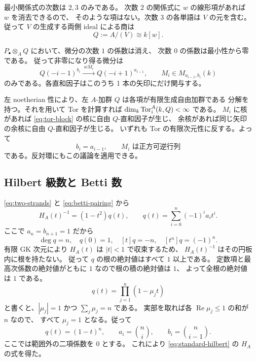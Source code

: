 最小関係式の次数は \(2,3\) のみである。
次数 \(2\) の関係式に \(w\) の線形項があれば \(w\) を消去できるので、
そのような項はない。次数 \(3\) の各単語は \(V\) の元を含む。
従って \(V\) の生成する両側 ideal による商は
\begin{equation}\label{eq:quotient-Q}
Q:=A/(V)\cong k[w].
\end{equation}

\(P_\bullet\otimes_AQ\) において、微分の次数 \(1\) の係数は消え、
次数 \(0\) の係数は最小性から零である。
従って非零になり得る微分は
\begin{equation}\label{eq:tor-block}
Q(-i-1)^{b_i}\xrightarrow{\;wM_i\;}
Q(-i+1)^{a_{i-1}},\qquad
M_i\in M_{a_{i-1},b_i}(k)
\end{equation}
のみである。各直和因子はこのうち 1 本の矢印にだけ関与する。

左 noetherian 性により、左 \(A\)-加群 \(Q\) は各項が有限生成自由加群である
分解を持つ。それを用いて Tor を計算すれば
\(\dim_k\operatorname{Tor}_i^A(k,Q)<\infty\) である。
\(M_i\) に核があれば \eqref{eq:tor-block} の核に自由 \(Q\)-直和因子が生じ、
余核があれば同じ矢印の余核に自由 \(Q\)-直和因子が生じる。
いずれも Tor の有限次元性に反する。よって
\begin{equation}\label{eq:betti-pairing}
b_i=a_{i-1},\qquad M_i\text{ は正方可逆行列}
\end{equation}
である。反対環にもこの議論を適用できる。

\subsection{Hilbert 級数と Betti 数}

\eqref{eq:two-strands} と \eqref{eq:betti-pairing} から
\[
H_A(t)^{-1}=(1-t^2)q(t),\qquad
q(t)=\sum_{i=0}^{n}(-1)^i a_it^i.
\]
ここで \(a_n=b_{n+1}=1\) だから
\[
\deg q=n,\quad q(0)=1,\quad [t]q=-n,\quad [t^n]q=(-1)^n.
\]
有限 GK 次元により \(H_A(t)\) は \(|t|<1\) で収束するため、
\(H_A(t)^{-1}\) はその円板内に根を持たない。
従って \(q\) の根の絶対値はすべて \(1\) 以上である。
定数項と最高次係数の絶対値がともに \(1\) なので根の積の絶対値は \(1\)、
よって全根の絶対値は \(1\) である。
\[
q(t)=\prod_{j=1}^{n}(1-\mu_jt)
\]
と書くと、\(|\mu_j|=1\) かつ \(\sum_j\mu_j=n\) である。
実部を取れば各 \(\operatorname{Re}\mu_j\le1\) の和が \(n\) なので、
すべて \(\mu_j=1\) となる。従って
\begin{equation}\label{eq:betti-binomial}
q(t)=(1-t)^n,\qquad
a_i=\binom ni,\qquad b_i=\binom n{i-1}.
\end{equation}
ここでは範囲外の二項係数を \(0\) とする。
これにより \eqref{eq:standard-hilbert} の \(H_A\) の式を得た。

